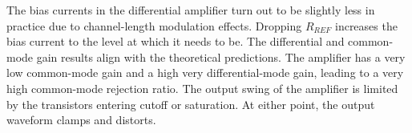 The bias currents in the differential amplifier turn out to be slightly less in practice due to channel-length modulation effects.
Dropping $R_{REF}$ increases the bias current to the level at which it needs to be.
The differential and common-mode gain results align with the theoretical predictions.
The amplifier has a very low common-mode gain and a high very differential-mode gain, leading to a very high common-mode rejection ratio.
The output swing of the amplifier is limited by the transistors entering cutoff or saturation.
At either point, the output waveform clamps and distorts.
